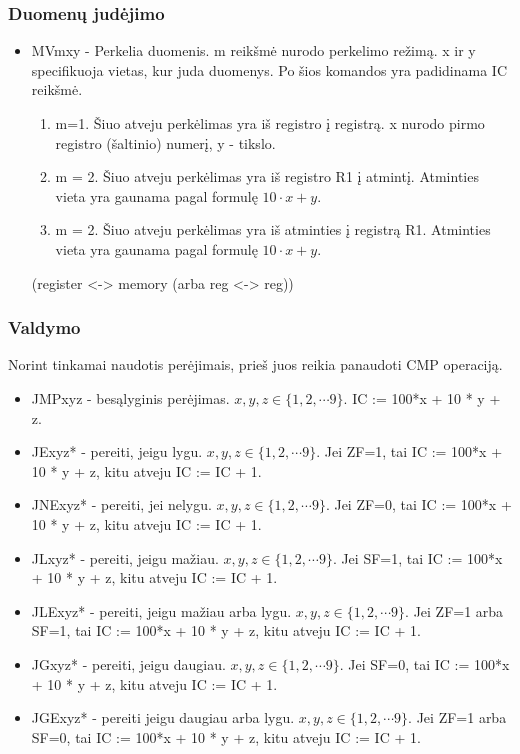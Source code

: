 \documentclass{VUMIFInfKursinis}
\begin{document}
\subsubsection{Duomenų judėjimo}
\begin{itemize}
	\item MVmxy - Perkelia duomenis. m reikšmė nurodo perkelimo režimą. x ir y specifikuoja vietas, kur juda duomenys. Po šios komandos yra padidinama IC reikšmė.
	\begin{enumerate}
		\item m=1. Šiuo atveju perkėlimas yra iš registro į registrą. x nurodo pirmo registro (šaltinio) numerį, y - tikslo.
		\item m = 2. Šiuo atveju perkėlimas yra iš registro R1 į atmintį. Atminties vieta yra gaunama pagal formulę $10 \cdot x + y$.
		\item m = 2. Šiuo atveju perkėlimas yra iš atminties į registrą R1. Atminties vieta yra gaunama pagal formulę $10 \cdot x + y$.
	\end{enumerate}(register <-> memory (arba reg <-> reg))
\end{itemize}

\subsubsection{Valdymo}
Norint tinkamai naudotis perėjimais, prieš juos reikia panaudoti CMP operaciją. 
\begin{itemize}
	\item JMPxyz - besąlyginis perėjimas. $x, y, z \in \{1, 2, \cdots 9 \}$. IC := 100*x + 10 * y + z.
	\item JExyz* - pereiti, jeigu lygu. $x, y, z \in \{1, 2, \cdots 9 \}$. Jei ZF=1, tai IC := 100*x + 10 * y + z, kitu atveju IC := IC + 1.
	\item JNExyz* - pereiti, jei nelygu. $x, y, z \in \{1, 2, \cdots 9 \}$. Jei ZF=0, tai IC := 100*x + 10 * y + z, kitu atveju IC := IC + 1.
	\item JLxyz* - pereiti, jeigu mažiau. $x, y, z \in \{1, 2, \cdots 9 \}$. Jei SF=1, tai IC := 100*x + 10 * y + z, kitu atveju IC := IC + 1.
	\item JLExyz* - pereiti, jeigu mažiau arba lygu. $x, y, z \in \{1, 2, \cdots 9 \}$. Jei ZF=1 arba SF=1, tai IC := 100*x + 10 * y + z, kitu atveju IC := IC + 1.
	\item JGxyz* - pereiti, jeigu daugiau. $x, y, z \in \{1, 2, \cdots 9 \}$. Jei SF=0, tai IC := 100*x + 10 * y + z, kitu atveju IC := IC + 1.
	\item JGExyz* - pereiti jeigu daugiau arba lygu. $x, y, z \in \{1, 2, \cdots 9 \}$. Jei ZF=1 arba SF=0, tai IC := 100*x + 10 * y + z, kitu atveju IC := IC + 1.
\end{itemize}
\end{document}
